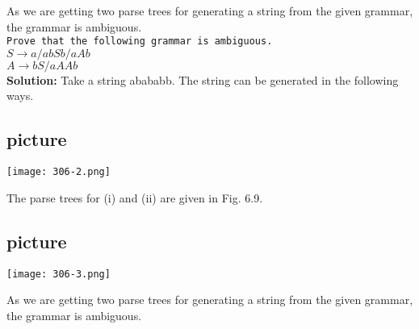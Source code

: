 \documentclass[9pt]{beamer}
\begin{document}
\begin{frame}
\hspace*{0.5cm} As we are getting two parse trees for generating a string from the given grammar, the grammar is
ambiguous.\\

\hspace*{0.1cm} \texttt{Prove that the following grammar is ambiguous.}\\

\vspace*{0.1cm}
\hspace*{4cm} $S \rightarrow a/abSb/aAb$ \\
\hspace*{4cm} $A \rightarrow bS/aAAb$ \\

\vspace*{0.2cm}
\textbf{Solution:} Take a string abababb. The string can be generated in the following ways.\\

\begin{flushleft}
  \section{picture}
\texttt{[image: 306-2.png]}
\end{flushleft}

\end{frame}

\begin{frame}
\hspace*{0.5cm} The parse trees for (i) and (ii) are given in Fig. 6.9.\\

\begin{center}
\section{picture}
\texttt{[image: 306-3.png]}
\end{center}

\hspace*{0.5cm} As we are getting two parse trees for generating a string from the given grammar, the grammar is
ambiguous.\\
\end{frame}
\end{document}
